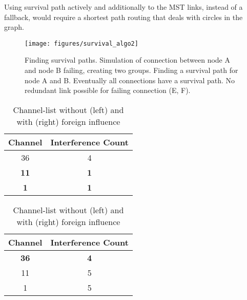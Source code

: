     Using survival path actively and additionally to the \ac{MST} links, instead of a fallback, 
    would require a shortest path routing that deals with circles in the graph.
   
    \begin{figure}[h!]
      \centering
      \texttt{[image: figures/survival\_algo2]}
      \caption{Finding survival paths. Simulation of connection between node A and node B failing, creating two groups.
	Finding a survival path for node A and B. Eventually all connections have a survival path. No redundant link possible for failing connection (E, F).}
      \label{fig:survival_algo}
    \end{figure}
    
    \begin{table}[h!]
      \centering
      \begin{tabular}{|c|c|}\hline
	Channel & Interference Count\\ \hline
	36 & 4 \\ \hline
	\textbf{11} & \textbf{1} \\ \hline
	\textbf{1} & \textbf{1} \\ \hline
      \end{tabular}
      \begin{tabular}{|c|c|}\hline
	Channel & Interference Count\\ \hline
	\textbf{36} & \textbf{4} \\ \hline
	11 & 5 \\ \hline
	1 & 5  \\ \hline
      \end{tabular}
      \caption{Channel-list without (left) and with (right) foreign influence}
    \end{table}
    
\newpage
    

